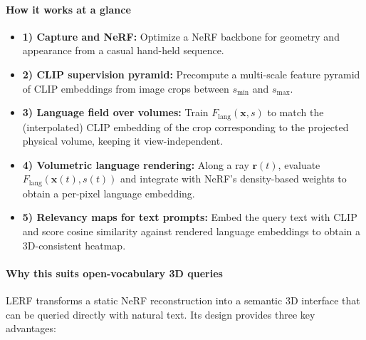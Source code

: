 \begin{enrichment}
\begin{enrichment}
        \paragraph{How it works at a glance}
        \begin{itemize}
            \item \textbf{1) Capture and NeRF:} Optimize a NeRF backbone for geometry and appearance from a casual hand-held sequence.
            \item \textbf{2) CLIP supervision pyramid:} Precompute a multi-scale feature pyramid of CLIP embeddings from image crops between $s_{\min}$ and $s_{\max}$.
            \item \textbf{3) Language field over volumes:} Train $F_{\text{lang}}(\mathbf{x}, s)$ to match the (interpolated) CLIP embedding of the crop corresponding to the projected physical volume, keeping it view-independent.
            \item \textbf{4) Volumetric language rendering:} Along a ray $\mathbf{r}(t)$, evaluate $F_{\text{lang}}(\mathbf{x}(t), s(t))$ and integrate with NeRF’s density-based weights to obtain a per-pixel language embedding.
            \item \textbf{5) Relevancy maps for text prompts:} Embed the query text with CLIP and score cosine similarity against rendered language embeddings to obtain a 3D-consistent heatmap.
        \end{itemize}
        
        \paragraph{Why this suits open-vocabulary 3D queries}
        LERF transforms a static NeRF reconstruction into a semantic 3D interface that can be queried directly with natural text. Its design provides three key advantages:
        

\end{enrichment}
\end{enrichment}
